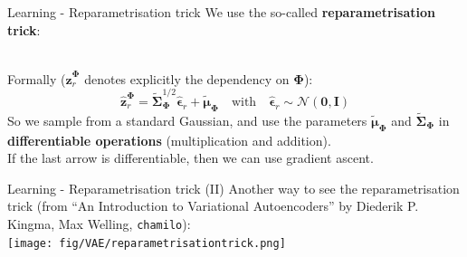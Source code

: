 \documentclass{beamer}
\newcommand{\MN}{{\mathcal N}}
\newcommand{\bs}[1]{\boldsymbol{#1}}
\begin{document}
\begin{frame}{Learning - Reparametrisation trick}
 We use the so-called \textbf{reparametrisation trick}:\vspace{3mm}
    \vspace{3mm}\\
  Formally ($\hat{\bs{z}}_r^{\bs{\Phi}}$ denotes explicitly the dependency on $\bs{\Phi}$):
  \begin{equation}
   \hat{\bs{z}}_r^{\bs{\Phi}} = \tilde{\bs{\Sigma}}_{\bs{\Phi}}^{1/2}\hat{\bs{\epsilon}}_r + \tilde{\bs{\mu}}_{\bs{\Phi}} \quad\text{with}\quad \hat{\bs{\epsilon}}_r\sim \MN(\bs{0},\bs{I})
  \end{equation}
  So we sample from a standard Gaussian, and use the parameters $ \tilde{\bs{\mu}}_{\bs{\Phi}}$ and $\tilde{\bs{\Sigma}}_{\bs{\Phi}} $ in \textbf{differentiable operations} (multiplication and addition).\vspace{3mm}\\
  
  If the last arrow is differentiable, then we can use gradient ascent.
\end{frame}

\begin{frame}{Learning - Reparametrisation trick (II)}
 Another way to see the reparametrisation trick (from ``An Introduction to Variational Autoencoders'' by Diederik P. Kingma, Max Welling, \texttt{chamilo}):\\
 \centering
 \texttt{[image: fig/VAE/reparametrisationtrick.png]}
\end{frame}
\end{document}
